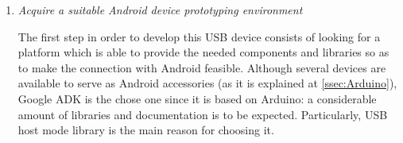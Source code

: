 			\begin{enumerate}
				\item \emph{Acquire a suitable Android device prototyping environment}\\
					\begin{comment}
					When we decide to develop a usb device the first step is look for a device tha provide
					the USB host libraries to connect to android, because the USB host device is which implements 
					most of comunication, thanks to this we can focus our efforts in just try a comunication with
					android with not so much worries, the device selected to this end was the goole ADK, that is 
					based on arduino(link).ADK is a device developed by google to help android developers to make 
					his first prototypes of USB connected devices. The google ADK is an Arduino with all the 
					facilities that a developer can expect such as libraries, some shields, examples and a good
					documentation, in our case we are specialy interested in the USB host comunication libraries.\\
					\end{comment}
					The first step in order to develop this USB device consists of looking for a platform which
					is able to provide the needed components and libraries so as to make the connection with
					Android feasible. Although several devices are available to serve as Android accessories (as
					it is explained at \autoref{ssec:Arduino}),	Google ADK is the chose one since it is based on
					Arduino: a considerable amount of libraries and documentation is to be expected. Particularly,
					USB host mode library is the main reason for choosing it.
	

\end{enumerate}
